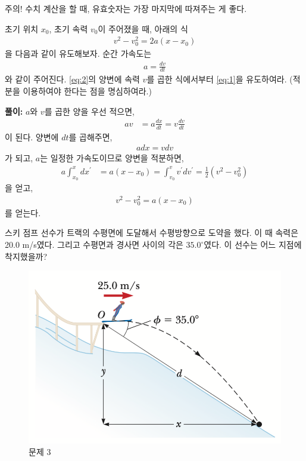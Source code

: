 \documentclass[floatfix,nofootinbib,superscriptaddress,fleqn,preprint]{revtex4-2}
\begin{document}
\noindent 
{\color{red} 주의! 수치 계산을 할 때, 유효숫자는 가장 마지막에
  따져주는 게 좋다.}


\vspace{1cm}
 초기 위치 $x_0$, 초기 속력 $v_0$이
주어졌을 때, 아래의 식
\begin{align}
  \label{eq:1}
v^2 - v_0^2 = 2a(x-x_0)  
\end{align}
을 다음과 같이 유도해보자. 순간 가속도는
\begin{align}
  \label{eq:2}
a = \frac{dv}{dt}
\end{align}
와 같이 주어진다. \eqref{eq:2}의 양변에 속력 $v$를 곱한 식에서부터
\eqref{eq:1}을 유도하여라. (적분을 이용하여야 한다는 점을 명심하여라.)
\vspace{0.2cm}

\noindent \textbf{풀이:}
$a$와 $v$를 곱한 양을 우선 적으면,
\begin{align}
  \label{eq:3}
  av &= a \frac{dx}{dt} = v \frac{dv}{dt} 
\end{align}
이 된다. 양변에 $dt$를 곱해주면, 
\begin{align}
  \label{eq:4}
a dx = v dv  
\end{align}
가 되고, $a$는 일정한 가속도이므로 양변을 적분하면, 
\begin{align}
a \int_{x_{0}}^{x}  dx^{\prime} &= a(x-x_{0}) 
  = \int_{v_{0}}^{v} v^{\prime} dv^{\prime} = \frac{1}{2} (v^{2} -
              v_{0}^{2}) 
\end{align}
을 얻고,
\begin{align}
  \label{eq:7}
v^2-v_0^2 = a(x-x_0)   
\end{align}
를 얻는다. 
\vspace{1cm}

스키 점프 선수가 트랙의 수평면에 도달해서 수평방향으로 도약을 했다. 이
때 속력은 20.0 m/s였다. 그리고 수평면과 경사면 사이의 각은
$35.0^\circ$였다. 이 선수는 어느 지점에 착지했을까?  
\begin{figure}[ht]
  \centering
\includegraphics[scale=0.6]{Qfig4-3.pdf}  
  \caption{문제 3}
  \label{fig:2}
\end{figure}
\vspace{0.2cm}
\end{document}
